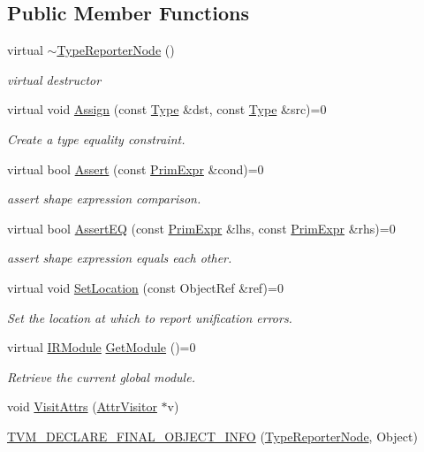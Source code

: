 \subsection*{Public Member Functions}
\begin{DoxyCompactItemize}
\item 
virtual \hyperlink{classtvm_1_1TypeReporterNode_a27933fa9205a2e6f46ae82b6dbe98e50}{$\sim$\+Type\+Reporter\+Node} ()
\begin{DoxyCompactList}\small\item\em virtual destructor \end{DoxyCompactList}\item 
virtual void \hyperlink{classtvm_1_1TypeReporterNode_aa974c8cddd300c1345f91f91da837087}{Assign} (const \hyperlink{classtvm_1_1Type}{Type} \&dst, const \hyperlink{classtvm_1_1Type}{Type} \&src)=0
\begin{DoxyCompactList}\small\item\em Create a type equality constraint. \end{DoxyCompactList}\item 
virtual bool \hyperlink{classtvm_1_1TypeReporterNode_a45f573e694c0d74b655564d8250e99be}{Assert} (const \hyperlink{classtvm_1_1PrimExpr}{Prim\+Expr} \&cond)=0
\begin{DoxyCompactList}\small\item\em assert shape expression comparison. \end{DoxyCompactList}\item 
virtual bool \hyperlink{classtvm_1_1TypeReporterNode_aeea573240a4b4a3c73f63724ea1120aa}{Assert\+EQ} (const \hyperlink{classtvm_1_1PrimExpr}{Prim\+Expr} \&lhs, const \hyperlink{classtvm_1_1PrimExpr}{Prim\+Expr} \&rhs)=0
\begin{DoxyCompactList}\small\item\em assert shape expression equals each other. \end{DoxyCompactList}\item 
virtual void \hyperlink{classtvm_1_1TypeReporterNode_a413a90b6800010533a99118e22108217}{Set\+Location} (const Object\+Ref \&ref)=0
\begin{DoxyCompactList}\small\item\em Set the location at which to report unification errors. \end{DoxyCompactList}\item 
virtual \hyperlink{classtvm_1_1IRModule}{I\+R\+Module} \hyperlink{classtvm_1_1TypeReporterNode_aff8186cce55fcfd0823b7b135b7db1e8}{Get\+Module} ()=0
\begin{DoxyCompactList}\small\item\em Retrieve the current global module. \end{DoxyCompactList}\item 
void \hyperlink{classtvm_1_1TypeReporterNode_a198f1301787886f56d5719ee4b070ade}{Visit\+Attrs} (\hyperlink{classtvm_1_1AttrVisitor}{Attr\+Visitor} $\ast$v)
\item 
\hyperlink{classtvm_1_1TypeReporterNode_aefb026f4302f5fafad0410c2db2178c3}{T\+V\+M\+\_\+\+D\+E\+C\+L\+A\+R\+E\+\_\+\+F\+I\+N\+A\+L\+\_\+\+O\+B\+J\+E\+C\+T\+\_\+\+I\+N\+FO} (\hyperlink{classtvm_1_1TypeReporterNode}{Type\+Reporter\+Node}, Object)
\end{DoxyCompactItemize}
